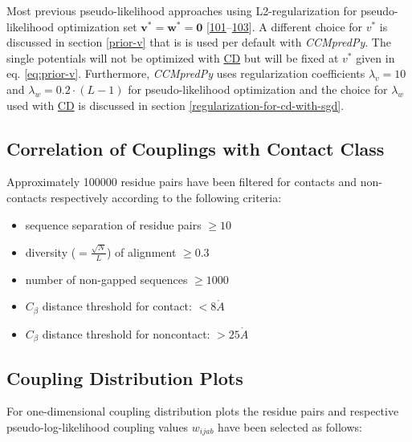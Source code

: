 \documentclass[11pt,a4paper,twoside]{book}
\providecommand{\tightlist}{%
  \setlength{\itemsep}{0pt}\setlength{\parskip}{0pt}}
\newcommand{\Cb}{C_\beta}
\newcommand{\eq}{\!=\!}
\renewcommand{\v}{\mathbf{v}}
\newcommand{\w}{\mathbf{w}}
\newcommand{\wijab}{w_{ijab}}
\newcommand{\angstrom}{\mathring{A} \;}
\theoremstyle{definition}
\theoremstyle{definition}
\theoremstyle{remark}
\begin{document}
Most previous pseudo-likelihood approaches using L2-regularization for
pseudo-likelihood optimization set \(\v^* \eq \w^* \eq \mathbf{0}\)
{[}\protect\hyperlink{ref-Seemayer2014}{101}--\protect\hyperlink{ref-Kamisetty2013}{103}{]}.
A different choice for \(v^*\) is discussed in section \ref{prior-v}
that is is used per default with \emph{CCMpredPy}. The single potentials
will not be optimized with \protect\hyperlink{abbrev}{CD} but will be
fixed at \(v^*\) given in eq. \eqref{eq:prior-v}. Furthermore,
\emph{CCMpredPy} uses regularization coefficients \(\lambda_v \eq 10\)
and \(\lambda_w \eq 0.2\cdot(L-1)\) for pseudo-likelihood optimization
and the choice for \(\lambda_w\) used with
\protect\hyperlink{abbrev}{CD} is discussed in section
\ref{regularization-for-cd-with-sgd}.

\subsection{Correlation of Couplings with Contact
Class}\label{method-coupling-correlation}

Approximately 100000 residue pairs have been filtered for contacts and
non-contacts respectively according to the following criteria:

\begin{itemize}
\tightlist
\item
  sequence separation of residue pairs \(\ge 10\)
\item
  diversity (\(=\frac{\sqrt{N}}{L}\)) of alignment \(\ge 0.3\)
\item
  number of non-gapped sequences \(\ge 1000\)
\item
  \(\Cb\) distance threshold for contact: \(<8\angstrom\)
\item
  \(\Cb\) distance threshold for noncontact: \(>25\angstrom\)
\end{itemize}

\subsection{Coupling Distribution Plots}\label{method-coupling-profile}

For one-dimensional coupling distribution plots the residue pairs and
respective pseudo-log-likelihood coupling values \(\wijab\) have been
selected as follows:
\end{document}
